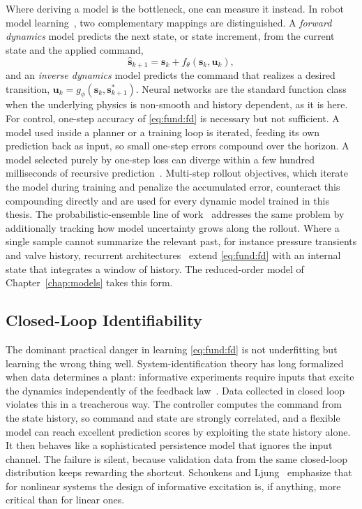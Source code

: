 Where deriving a model is the bottleneck, one can measure it instead. In
robot model learning~\cite{nguyentuong2011model}, two complementary
mappings are distinguished. A \emph{forward dynamics} model predicts the
next state, or state increment, from the current state and the applied
command,
%
\begin{equation}
  \label{eq:fund:fd}
  \hat{\bm{s}}_{k+1} = \bm{s}_k + f_\theta(\bm{s}_k, \bm{u}_k),
\end{equation}
%
and an \emph{inverse dynamics} model predicts the command that realizes
a desired transition, $\bm{u}_k = g_\phi(\bm{s}_k, \bm{s}^{*}_{k+1})$.
Neural networks are the standard function class when the underlying
physics is non-smooth and history dependent, as it is here. For control,
one-step accuracy of \eqref{eq:fund:fd} is necessary but not
sufficient. A model used inside a planner or a training loop is iterated, feeding its
own prediction back as input, so small one-step errors compound over the
horizon. A model selected purely by one-step loss can diverge within a few
hundred milliseconds of recursive prediction~\cite{nagabandi2018neural}.
Multi-step rollout objectives, which iterate the model during training and
penalize the accumulated error, counteract this compounding directly and
are used for every dynamic model trained in this thesis. The
probabilistic-ensemble line of work~\cite{chua2018deep} addresses the
same problem by additionally tracking how model uncertainty grows along
the rollout. Where a single sample cannot summarize the relevant past,
for instance pressure transients and valve history, recurrent
architectures~\cite{hochreiter1997long,cho2014learning} extend
\eqref{eq:fund:fd} with an internal state that integrates a window of
history. The reduced-order model of Chapter~\ref{chap:models} takes this
form.

\subsection{Closed-Loop Identifiability}
\label{sec:fund:identifiability}

The dominant practical danger in learning \eqref{eq:fund:fd} is not
underfitting but learning the wrong thing well. System-identification
theory has long formalized when data determines a plant: informative
experiments require inputs that excite the dynamics independently of the
feedback law~\cite{ljung1999system,isermann2011identification}. Data
collected in closed loop violates this in a treacherous way. The
controller computes the command from the state history, so command and
state are strongly correlated, and a flexible model can reach excellent
prediction scores by exploiting the state history alone. It then behaves
like a sophisticated persistence model that ignores the input channel.
The failure is silent, because validation data from the same closed-loop
distribution keeps rewarding the shortcut. Schoukens and
Ljung~\cite{schoukens2019nonlinear} emphasize that for nonlinear systems
the design of informative excitation is, if anything, more critical than
for linear ones.

